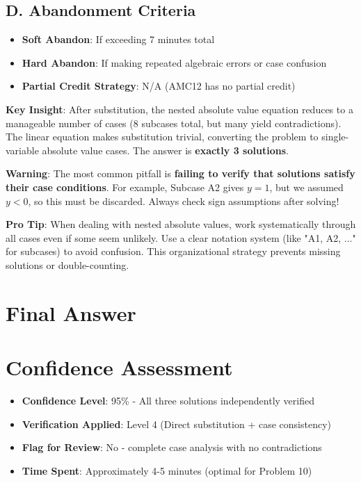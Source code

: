 \documentclass[]{article}
\begin{document}
\begin{competitionbox}
\subsection*{D. Abandonment Criteria}
\begin{itemize}[leftmargin=*]
    \item \textbf{Soft Abandon}: If exceeding 7 minutes total
    \item \textbf{Hard Abandon}: If making repeated algebraic errors or case confusion
    \item \textbf{Partial Credit Strategy}: N/A (AMC12 has no partial credit)
\end{itemize}
\end{competitionbox}

\begin{keyinsightbox}
\textbf{Key Insight}: After substitution, the nested absolute value equation reduces to a manageable number of cases (8 subcases total, but many yield contradictions). The linear equation makes substitution trivial, converting the problem to single-variable absolute value cases. The answer is \textbf{exactly 3 solutions}.
\end{keyinsightbox}

\begin{warningbox}
\textbf{Warning}: The most common pitfall is \textbf{failing to verify that solutions satisfy their case conditions}. For example, Subcase A2 gives $y=1$, but we assumed $y < 0$, so this must be discarded. Always check sign assumptions after solving!
\end{warningbox}

\begin{tipbox}
\textbf{Pro Tip}: When dealing with nested absolute values, work systematically through all cases even if some seem unlikely. Use a clear notation system (like "A1, A2, ..." for subcases) to avoid confusion. This organizational strategy prevents missing solutions or double-counting.
\end{tipbox}

\section*{Final Answer}

\section*{Confidence Assessment}
\begin{itemize}[leftmargin=*]
    \item \textbf{Confidence Level}: 95\% - All three solutions independently verified
    \item \textbf{Verification Applied}: Level 4 (Direct substitution + case consistency)
    \item \textbf{Flag for Review}: No - complete case analysis with no contradictions
    \item \textbf{Time Spent}: Approximately 4-5 minutes (optimal for Problem 10)
\end{itemize}
\end{document}
